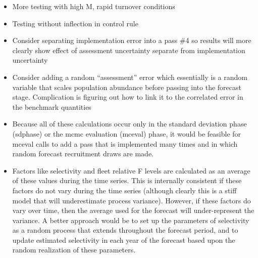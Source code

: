 \begin{itemize}
	\item More testing with high M, rapid turnover conditions
	\item Testing without inflection in control rule
	\item Consider separating implementation error into a pass \#4 so results will more clearly show effect of assessment uncertainty separate from implementation uncertainty
	\item Consider adding a random ``assessment'' error which essentially is a random variable that scales population abundance before passing into the forecast stage. Complication is figuring out how to link it to the correlated error in the benchmark quantities
	\item Because all of these calculations occur only in the standard deviation phase (sdphase) or the \gls{mcmc} evaluation (mceval) phase, it would be feasible for mceval calls to add a pass that is implemented many times and in which random forecast recruitment draws are made.
	\item Factors like selectivity and fleet relative F levels are calculated as an average of these values during the time series. This is internally consistent if these factors do not vary during the time series (although clearly this is a stiff model that will underestimate process variance). However, if these factors do vary over time, then the average used for the forecast will under-represent the variance. A better approach would be to set up the parameters of selectivity as a random process that extends throughout the forecast period, and to update estimated selectivity in each year of the forecast based upon the random realization of these parameters.
\end{itemize}

	
